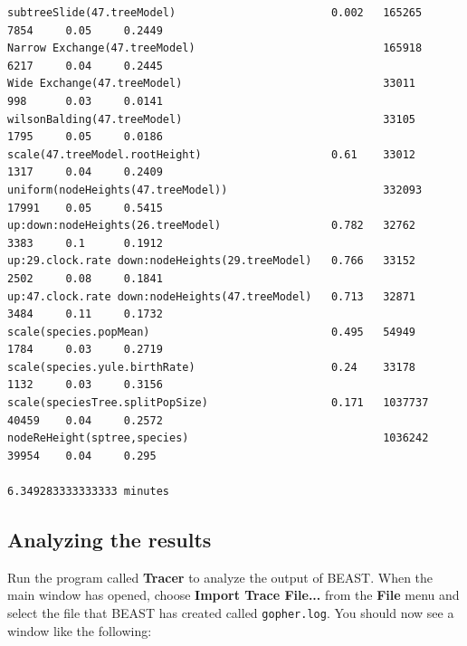 \documentclass[12pt]{article}
\begin{document}
{\begin{verbatim}
subtreeSlide(47.treeModel)                        0.002   165265     7854     0.05     0.2449      
Narrow Exchange(47.treeModel)                             165918     6217     0.04     0.2445      
Wide Exchange(47.treeModel)                               33011      998      0.03     0.0141      
wilsonBalding(47.treeModel)                               33105      1795     0.05     0.0186      
scale(47.treeModel.rootHeight)                    0.61    33012      1317     0.04     0.2409      
uniform(nodeHeights(47.treeModel))                        332093     17991    0.05     0.5415      
up:down:nodeHeights(26.treeModel)                 0.782   32762      3383     0.1      0.1912      
up:29.clock.rate down:nodeHeights(29.treeModel)   0.766   33152      2502     0.08     0.1841      
up:47.clock.rate down:nodeHeights(47.treeModel)   0.713   32871      3484     0.11     0.1732      
scale(species.popMean)                            0.495   54949      1784     0.03     0.2719      
scale(species.yule.birthRate)                     0.24    33178      1132     0.03     0.3156      
scale(speciesTree.splitPopSize)                   0.171   1037737    40459    0.04     0.2572      
nodeReHeight(sptree,species)                              1036242    39954    0.04     0.295       

6.349283333333333 minutes 

\end{verbatim}}

\subsection*{Analyzing the results}

Run the program called {\bf Tracer} to analyze the output of BEAST. When the main
window has opened, choose {\bf Import Trace File...} from the {\bf File} menu and select the file that
BEAST has created called \texttt{gopher.log}.
You should now see a window like the following:

\medskip{}

\end{document}
